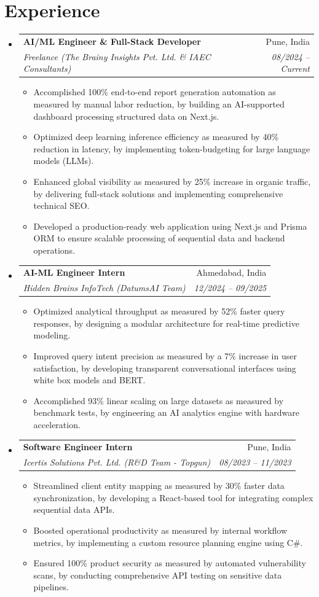 \documentclass[10pt,a4paper]{article}
\makeatletter
\newcommand{\resumeItem}[1]{\item\small{#1}}
\newcommand{\resumeSubheading}[4]{
  \vspace{-1pt}\item
    \begin{tabular*}{1.0\textwidth}[t]{l@{\extracolsep{\fill}}r}
      \textbf{#1} & #2 \\
      \textit{\small#3} & \textit{\small #4} \\
    \end{tabular*}\vspace{-5pt}
}
\makeatother
\begin{document}
\section{Experience}
\begin{itemize}[leftmargin=0.15in, label={}]
    \resumeSubheading
      {AI/ML Engineer \& Full-Stack Developer}{Pune, India}
      {Freelance (The Brainy Insights Pvt. Ltd. \& IAEC Consultants)}{08/2024 -- Current}
      \begin{itemize}[leftmargin=0.15in, label={\textbullet}]
        \resumeItem{Accomplished 100\% end-to-end report generation automation as measured by manual labor reduction, by building an AI-supported dashboard processing structured data on Next.js.}
        \resumeItem{Optimized deep learning inference efficiency as measured by 40\% reduction in latency, by implementing token-budgeting for large language models (LLMs).}
        \resumeItem{Enhanced global visibility as measured by 25\% increase in organic traffic, by delivering full-stack solutions and implementing comprehensive technical SEO.}
        \resumeItem{Developed a production-ready web application using Next.js and Prisma ORM to ensure scalable processing of sequential data and backend operations.}
      \end{itemize}
    \resumeSubheading
      {AI-ML Engineer Intern}{Ahmedabad, India}
      {Hidden Brains InfoTech (DatumsAI Team)}{12/2024 -- 09/2025}
      \begin{itemize}[leftmargin=0.15in, label={\textbullet}]
        \resumeItem{Optimized analytical throughput as measured by 52\% faster query responses, by designing a modular architecture for real-time predictive modeling.}
        \resumeItem{Improved query intent precision as measured by a 7\% increase in user satisfaction, by developing transparent conversational interfaces using white box models and BERT.}
        \resumeItem{Accomplished 93\% linear scaling on large datasets as measured by benchmark tests, by engineering an AI analytics engine with hardware acceleration.}
      \end{itemize}
    \resumeSubheading
      {Software Engineer Intern}{Pune, India}
      {Icertis Solutions Pvt. Ltd. (R\&D Team - Topgun)}{08/2023 -- 11/2023}
      \begin{itemize}[leftmargin=0.15in, label={\textbullet}]
        \resumeItem{Streamlined client entity mapping as measured by 30\% faster data synchronization, by developing a React-based tool for integrating complex sequential data APIs.}
        \resumeItem{Boosted operational productivity as measured by internal workflow metrics, by implementing a custom resource planning engine using C\#.}
        \resumeItem{Ensured 100\% product security as measured by automated vulnerability scans, by conducting comprehensive API testing on sensitive data pipelines.}
      \end{itemize}
\end{itemize}
\end{document}
